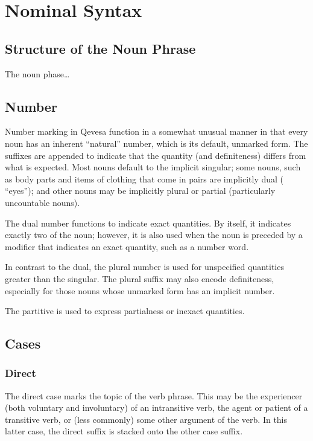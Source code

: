 \documentclass[grammar]{subfiles}
\begin{document}
\chapter{Nominal Syntax}
\label{ch:nominal_syntax}


\section{Structure of the Noun Phrase}
\label{sec:ns_structure}

The noun phase…


\section{Number}
\label{sec:ns_number}

Number marking in Qevesa function in a somewhat unusual manner in that every
noun has an inherent “natural” number, which is its default, unmarked form.
The suffixes are appended to indicate that the quantity (and definiteness)
differs from what is expected.  Most nouns default to the implicit singular;
some nouns, such as body parts and items of clothing that come in pairs are
implicitly dual ( “eyes”); and other nouns may be implicitly plural or
partial (particularly uncountable nouns). 

The dual number functions to indicate exact quantities.  By itself, it
indicates exactly two of the noun; however, it is also used when the noun is
preceded by a modifier that indicates an exact quantity, such as a number word.

In contrast to the dual, the plural number is used for unspecified quantities
greater than the singular.  The plural suffix may also encode definiteness,
especially for those nouns whose unmarked form has an implicit number. 

The partitive is used to express partialness or inexact quantities. 


\section{Cases}
\label{sec:ns_cases}

%


\subsection{Direct}
\label{ssec:ns_direct_case}

The direct case marks the topic of the verb phrase.  This may be the
experiencer (both voluntary and involuntary) of an intransitive verb, the agent
or patient of a transitive verb, or (less commonly) some other argument of the
verb.  In this latter case, the direct suffix is stacked onto the other case
suffix. 
\end{document}
